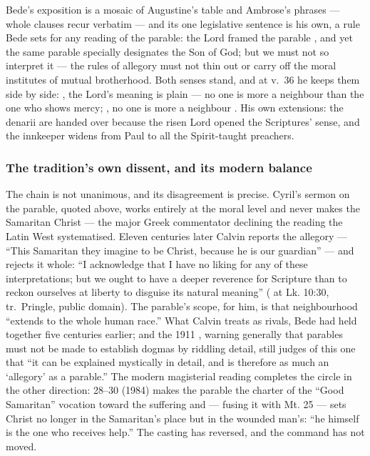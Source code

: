 \begin{witnessnote}
Bede's exposition is a mosaic of Augustine's table and Ambrose's phrases ---
whole clauses recur verbatim --- and its one legislative sentence is his own,
a rule Bede sets for any reading of the parable: the Lord framed the parable , and yet the same parable
specially designates the Son of God; but we must not so interpret it
 --- the rules of allegory must not thin out or
carry off the moral institutes of mutual brotherhood. Both senses stand, and
at v.~36 he keeps them side by side: , the Lord's
meaning is plain --- no one is more a neighbour than the one who shows mercy;
, no one is more a neighbour . His own extensions: the denarii are handed over
 because the risen Lord opened the Scriptures' sense, and
the innkeeper widens from Paul to all the Spirit-taught preachers.
\end{witnessnote}

\subsubsection*{The tradition's own dissent, and its modern balance}

The chain is not unanimous, and its disagreement is precise.
Cyril's sermon on the parable, quoted above, works entirely at the moral
level and never makes the Samaritan Christ --- the major Greek commentator
declining the reading the Latin West systematised. Eleven centuries later
Calvin reports the allegory --- ``This Samaritan they imagine to be Christ,
because he is our guardian'' --- and rejects it whole: ``I acknowledge that I
have no liking for any of these interpretations; but we ought to have a
deeper reverence for Scripture than to reckon ourselves at liberty to
disguise its natural meaning'' ( at Lk.
10:30, tr.\ Pringle, public domain). The parable's scope, for him, is that
neighbourhood ``extends to the whole human race.'' What Calvin treats as
rivals, Bede had held together five centuries earlier; and the 1911
, warning generally that parables must not be
made to establish dogmas by riddling detail, still judges of this one that
``it can be explained mystically in detail, and is therefore as much an
`allegory' as a parable.'' The modern magisterial reading completes the
circle in the other direction:  28--30 (1984) makes
the parable the charter of the ``Good Samaritan'' vocation toward the
suffering and --- fusing it with Mt. 25 --- sets Christ no longer in the
Samaritan's place but in the wounded man's: ``he himself is the one who
receives help.'' The casting has reversed, and the command has not moved.

